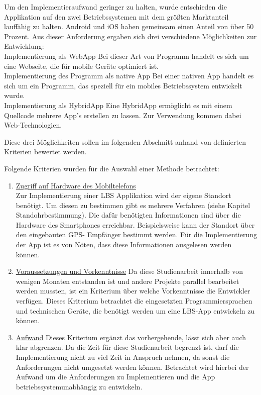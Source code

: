 Um den Implementieraufwand geringer zu halten, wurde entschieden die Applikation auf den zwei Betriebssystemen mit dem größten Marktanteil lauffähig zu halten. 
Android und iOS haben gemeinsam einen Anteil von über 50 Prozent. Aus dieser 
Anforderung ergaben sich drei verschiedene Möglichkeiten zur Entwicklung:
\\Implementierung als WebApp
Bei dieser Art von Programm handelt es sich um eine Webseite, die für mobile 
Geräte optimiert ist.
\\Implementierung des Programm als native App
Bei einer nativen App handelt es sich um ein Programm, das speziell für ein mobiles Betriebssystem entwickelt wurde.
\\Implementierung als HybridApp
Eine HybridApp ermöglicht es mit einem Quellcode mehrere App's erstellen zu lassen. 
Zur Verwendung kommen dabei Web-Technologien.

Diese drei Möglichkeiten sollen im folgenden Abschnitt anhand von definierten 
Kriterien bewertet werden.


Folgende Kriterien wurden für die Auswahl einer Methode betrachtet:
\begin{enumerate}
\item \underline{Zugriff auf Hardware des Mobiltelefons}
\\Zur Implementierung einer LBS Applikation wird der eigene Standort benötigt. Um 
diesen zu bestimmen gibt es mehrere Verfahren (siehe Kapitel Standohrbestimmung). 
Die dafür benötigten Informationen sind über die Hardware des 
Smartphones erreichbar. Beispielsweise kann der Standort über den eingebauten GPS-
Empfänger bestimmt werden. Für die Implementierung der App ist es von Nöten, dass 
diese Informationen ausgelesen werden können.

\item \underline{Voraussetzungen und Vorkenntnisse}
Da diese Studienarbeit innerhalb von wenigen Monaten entstanden ist und andere Projekte 
parallel bearbeitet werden mussten, ist ein Kriterium über welche Vorkenntnisse die 
Entwickler verfügen. Dieses Kriterium betrachtet die eingesetzten 
Programmiersprachen und technischen Geräte, die benötigt werden um eine LBS-App 
entwickeln zu können.


\item \underline{Aufwand}
Dieses Kriterium ergänzt das vorhergehende, lässt sich aber auch klar abgrenzen. Da 
die Zeit für diese Studienarbeit begrenzt ist, darf die Implementierung nicht zu 
viel Zeit in Anspruch nehmen, da sonst die Anforderungen nicht umgesetzt werden 
können. Betrachtet wird hierbei der Aufwand um die Anforderungen zu 
Implementieren und die App betriebssystemunabhängig zu entwickeln.
\end{enumerate}

